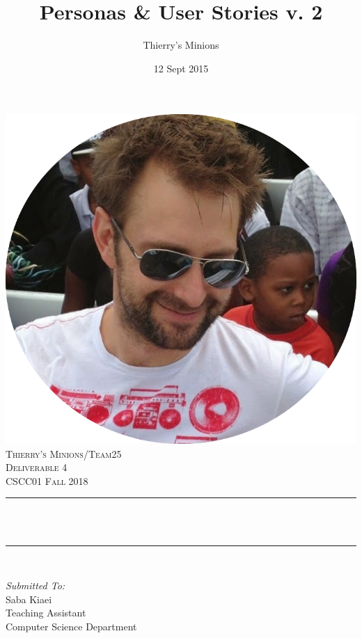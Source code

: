 \documentclass[12pt]{article}
\title{Personas \& User Stories v. 2}								%
\author{Thierry's Minions}								%
\date{12 Sept 2015}											%
\makeatletter
\let\thetitle\@title
\makeatother
\begin{document}

\begin{titlepage}
	\centering
    \vspace*{0.5 cm}
    \includegraphics[scale = 0.25]{leader.png}\\[1.0 cm]	%
    \textsc{\LARGE Thierry's Minions/Team25\\[0.5em] Deliverable 4}\\[2.0 cm]	
	\textsc{\Large CSCC01 Fall 2018}\\[0.5 cm]				%
	\rule{\linewidth}{0.2 mm} \\[0.4 cm]
	{ \huge \bfseries \thetitle}\\
	\rule{\linewidth}{0.2 mm} \\[1.5 cm]
	
	\begin{minipage}{0.4\textwidth}
		\begin{flushleft} \large
			\emph{Submitted To:}\\
			Saba Kiaei\\
            Teaching Assistant\\
            Computer Science Department\\
			\end{flushleft}
			\end{minipage}~
			\begin{minipage}{0.4\textwidth}
            

\end{minipage}
\end{titlepage}
\end{document}
